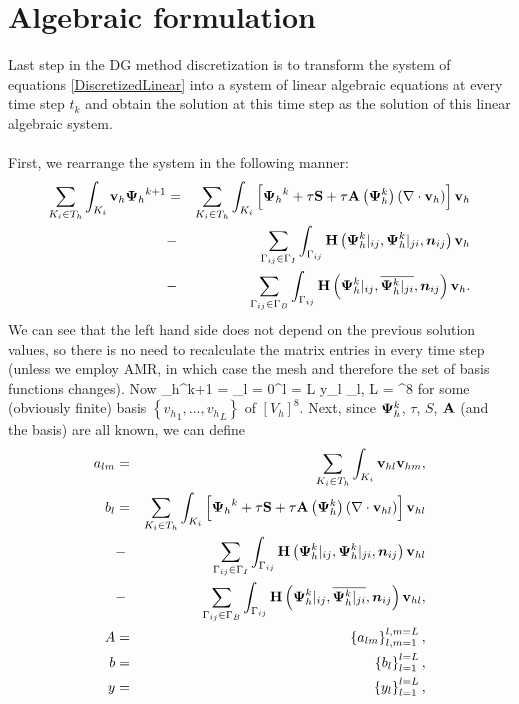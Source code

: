 \section{Algebraic formulation}
Last step in the DG method discretization is to transform the system of equations \ref{DiscretizedLinear} into a system of linear algebraic equations at every time step $t_k$ and obtain the solution at this time step as the solution of this linear algebraic system.
\paragraph{}
First, we rearrange the system in the following manner:
\begin{eqnarray}
\label{RewrittenLinearSystem} \sum_{K_i \in T_h}\int_{K_i} \mathrm{\mathbf{v}}_h {\mathrm{\mathbf{\Psi}}_h}^{k+1} & = &
\sum_{K_i \in T_h}\int_{K_i} \left[{\mathrm{\mathbf{\Psi}}_h}^{k} + \tau\mathrm{\mathbf{S}} + \tau\mathrm{\mathbf{A}}\left({\mathrm{\mathbf{\Psi}}_h^{k}}\right) \left(\nabla \cdot \mathrm{\mathbf{v}}_h\right)\right] \mathrm{\mathbf{v}}_h \\\nonumber& - &\sum_{\Gamma_{ij}\in\Gamma_I} \int_{\Gamma_{ij}}\mathrm{\mathbf{H}}\left({\mathrm{\mathbf{\Psi}}_h^{k}}|_{ij}, {\mathrm{\mathbf{\Psi}}_h^{k}}|_{ji}, \mbox{\boldmath $n$}_{ij}\right) \mathrm{\mathbf{v}}_h
\\\nonumber& - &\sum_{\Gamma_{ij}\in\Gamma_B} \int_{\Gamma_{ij}} \mathrm{\mathbf{H}}\left({\mathrm{\mathbf{\Psi}}_h^{k}}|_{ij}, \overline{{\mathrm{\mathbf{\Psi}}_h^{k}}|_{ji}}, \mbox{\boldmath $n$}_{ij}\right) \mathrm{\mathbf{v}}_h.
\end{eqnarray}
We can see that the left hand side does not depend on the previous solution values, so there is no need to recalculate the matrix entries in every time step (unless we employ AMR, in which case the mesh and therefore the set of basis functions changes).
Now
\be
\label{Coeffs} {\mrPsi_h}^{k+1} = \sum_{l = 0}^{l = L} y_l {\mrvh}_l, L = \lo\left[V_h\right]^8\ro
\ee
for some (obviously finite) basis $\left\{{v_h}_1, ..., {v_h}_L\right\}$ of $\left[V_h\right]^8$.
Next, since $\mathrm{\mathbf{\Psi}}_h^{k}$, $\tau$, $S$, $\mathrm{\mathbf{A}}$ (and the basis) are all known, we can define
\begin{eqnarray}
\label{Linear1}
a_{lm} & = & \sum_{K_i \in T_h}\int_{K_i} \mathrm{\mathbf{v}}_{hl} \mathrm{\mathbf{v}}_{hm}, \\
\label{Linear2}
b_{l} & = & \sum_{K_i \in T_h}\int_{K_i} \left[{\mathrm{\mathbf{\Psi}}_h}^{k} + \tau\mathrm{\mathbf{S}} + \tau\mathrm{\mathbf{A}}\left({\mathrm{\mathbf{\Psi}}_h^{k}}\right) \left(\nabla \cdot \mathrm{\mathbf{v}}_{hl}\right)\right] \mathrm{\mathbf{v}}_{hl}\\\nonumber & - &\sum_{\Gamma_{ij}\in\Gamma_I} \int_{\Gamma_{ij}}\mathrm{\mathbf{H}}\left({\mathrm{\mathbf{\Psi}}_h^{k}}|_{ij}, {\mathrm{\mathbf{\Psi}}_h^{k}}|_{ji}, \mbox{\boldmath $n$}_{ij}\right) \mathrm{\mathbf{v}}_{hl}\\\nonumber& - &
\sum_{\Gamma_{ij}\in\Gamma_B} \int_{\Gamma_{ij}} \mathrm{\mathbf{H}}\left({\mathrm{\mathbf{\Psi}}_h^{k}}|_{ij}, \overline{{\mathrm{\mathbf{\Psi}}_h^{k}}|_{ji}}, \mbox{\boldmath $n$}_{ij}\right) \mathrm{\mathbf{v}}_{hl},\\
\label{Linear3}
A & = & \left\{a_{lm}\right\}_{l,m = 1}^{l,m = L},\\
\label{Linear4}
b & = & \left\{b_{l}\right\}_{l = 1}^{l = L},\\
y & = & \left\{y_{l}\right\}_{l = 1}^{l = L},
\label{Linear5}
\end{eqnarray}

